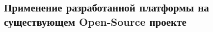 




\subsection{Применение разработанной платформы на существующем Open-Source проекте}


\pagebreak
